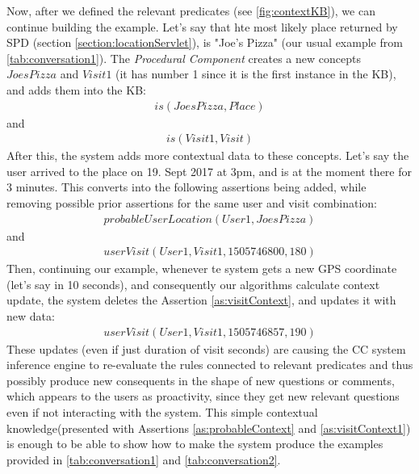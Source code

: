 Now, after we defined the relevant predicates (see \autoref{fig:contextKB}), we 
can continue building the example.
Let's say that hte most likely place returned by SPD
(section \ref{section:locationServlet}), is "Joe's Pizza"
(our usual example from \autoref{tab:conversation1}). The 
\emph{Procedural Component} creates a new concepts  $JoesPizza$ and 
$Visit1$ (it has number 1 since it is the first instance in the KB), and adds 
them into the KB:
\begin{equation}\label{as:joesPizza}
\begin{gathered}
	is(JoesPizza,Place)
\end{gathered}
\end{equation}
and
\begin{equation}\label{as:visit1}
\begin{gathered}
	is(Visit1,Visit)
\end{gathered}
\end{equation}
After this, the system adds more contextual data to these concepts. Let's say
the user arrived to the place on 19. Sept 2017 at 3pm, and is at the moment
there for 3 minutes. This converts into the following assertions being added, 
while removing possible prior assertions for the same user and visit 
combination:
\begin{equation}\label{as:probableContext}
\begin{gathered}
	probableUserLocation(User1,JoesPizza)
\end{gathered}
\end{equation}
and
\begin{equation}\label{as:visitContext}
\begin{gathered}
	userVisit(User1,Visit1,1505746800,180)
\end{gathered}
\end{equation}
Then, continuing our example, whenever te system gets a new GPS coordinate
(let's say in 10 seconds), and consequently our algorithms calculate context 
update, the system deletes the Assertion \ref{as:visitContext}, and updates it
with new data:
\begin{equation}\label{as:visitContext1}
\begin{gathered}
	userVisit(User1,Visit1,1505746857,190)
\end{gathered}
\end{equation}
These updates (even if just duration of visit seconds) are causing the CC 
system inference engine to re-evaluate the rules connected to relevant 
predicates and thus possibly produce new consequents in the shape of new 
questions or comments, which appears to the users as proactivity, since they 
get new relevant questions even if not interacting with the system.
This simple contextual knowledge(presented with Assertions 
\ref{as:probableContext} and \ref{as:visitContext1}) is enough to be able to 
show how to make the system produce the examples provided in 
\autoref{tab:conversation1} and \autoref{tab:conversation2}.

